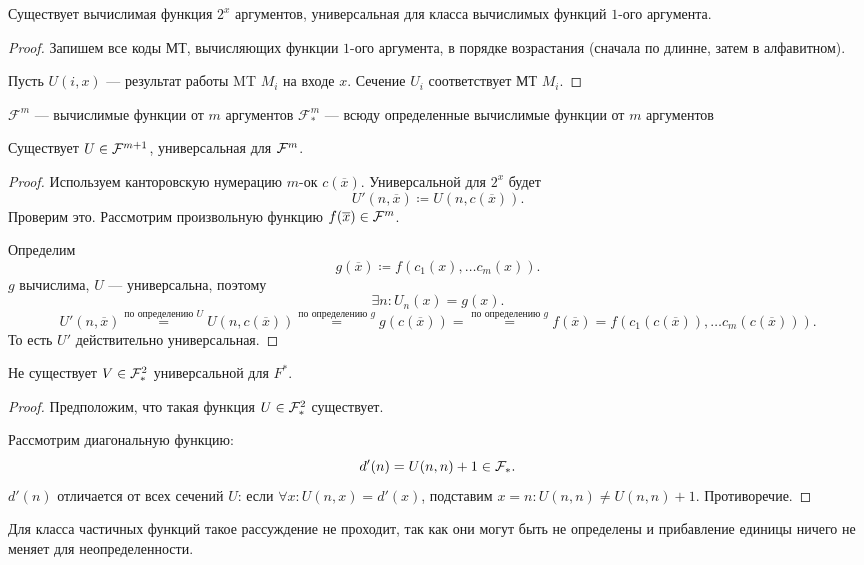 \begin{thm}
    Существует вычислимая функция $ 2^{x}$ аргументов, универсальная для класса вычислимых функций $ 1$-ого аргумента.
\end{thm}
\begin{proof}
	Запишем все коды МТ, вычисляющих функции $ 1$-ого аргумента, в порядке возрастания (сначала по длинне, затем в алфавитном).

	Пусть $ U(i, x)$ --- результат работы MT  $ M_i$ на входе $ x$. Сечение $ U_i$ соответствует МТ $ M_i$.
\end{proof}

\begin{name}
	$ \mathcal{F}^{m}$ --- вычислимые функции от $  m$ аргументов
	$ \mathcal{F}^{m}_{*}$ --- всюду определенные вычислимые функции от $  m$ аргументов
\end{name}

\begin{cor}
    Существует $ U \in  \mathcal{F}^{m+1}$, универсальная для $ \mathcal{F}^{m}$.
\end{cor}
\begin{proof}
	Используем канторовскую нумерацию $ m$-ок $ c(\overline{x})$.
	Универсальной для $ 2^{x}$ будет
	\[
		U'(n, \overline{x}) \coloneqq U(n, c(\overline{x}))
	.\] 
	Проверим это. Рассмотрим произвольную функцию $ f(\overline{x}) \in \mathcal{F}^{m}$.

	Определим 
	\[
		g(\overline{x})\coloneqq f(c_1(x), \ldots c_m(x))
	.\] 
	$ g$ вычислима, $ U$ --- универсальна, поэтому 
	\[
		\exists n \colon  U_n(x) = g(x)
	.\] 
	\[
		U'(n, \overline{x}) \stackrel{\text{по определению } U}{=} U(n, c(\overline{x})) \stackrel{\text{по определению } g}{=} g(c(\overline{x})) = \stackrel{\text{по определению } g}{=}  f(\overline{x}) = f(c_1(c(\overline{x})), \ldots c_{m}(c(\overline{x})))
	.\] 
	То есть $ U'$ действительно универсальная.
\end{proof}


\begin{thm}
    Не существует $ V \in \mathcal{F}_{*}^{2}$ универсальной для $ F^{*}$.
\end{thm}
\begin{proof}
    Предположим, что такая функция $ U \in  \mathcal{F}_{*}^{2}$ существует.

	Рассмотрим диагональную функцию:
	\[
		d'(n) = U(n, n) + 1 \in \mathcal{F}_{*}
	.\] 
	$d'(n)$ отличается от всех сечений $ U$: если $ \forall x \colon U(n, x) = d'(x)$, подставим $ x= n \colon U(n, n) \ne U(n, n ) + 1$. Противоречие. 
\end{proof}
\begin{note}
    Для класса частичных функций такое рассуждение не проходит, так как они могут быть не определены и прибавление единицы ничего не меняет для неопределенности.
\end{note}

